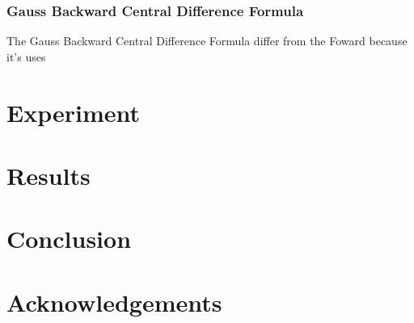 \documentclass[conference]{acmsiggraph}
\begin{document}
\subsubsection{Gauss Backward Central Difference Formula}
	The Gauss Backward Central Difference Formula differ from the Foward because it's uses 

\section{Experiment}

\section{Results}

\section{Conclusion}

\section*{Acknowledgements}



\end{document}
